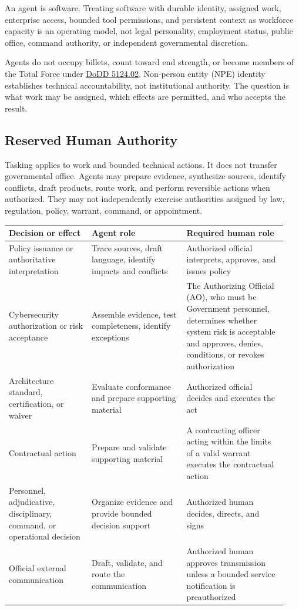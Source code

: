 \documentclass[11pt]{article}
\begin{document}
An agent is software. Treating software with durable identity, assigned
work, enterprise access, bounded tool permissions, and persistent
context as workforce capacity is an operating model, not legal
personality, employment status, public office, command authority, or
independent governmental discretion.

Agents do not occupy billets, count toward end strength, or become
members of the Total Force under
\href{https://www.esd.whs.mil/Portals/54/Documents/DD/issuances/dodd/512402p.PDF}{DoDD
5124.02}. Non-person entity (NPE) identity establishes technical
accountability, not institutional authority. The question is what work
may be assigned, which effects are permitted, and who accepts the
result.

\hypertarget{reserved-human-authority}{%
\subsection{Reserved Human Authority}\label{reserved-human-authority}}

Tasking applies to work and bounded technical actions. It does not
transfer governmental office. Agents may prepare evidence, synthesize
sources, identify conflicts, draft products, route work, and perform
reversible actions when authorized. They may not independently exercise
authorities assigned by law, regulation, policy, warrant, command, or
appointment.

\begingroup\footnotesize\setlength{\tabcolsep}{3pt}\begin{longtable}{p{0.28\linewidth}p{0.32\linewidth}p{0.34\linewidth}}
\toprule\noalign{}
Decision or effect & Agent role & Required human role \\
\midrule\noalign{}
\endhead
\bottomrule\noalign{}
\endlastfoot
Policy issuance or authoritative interpretation & Trace sources, draft
language, identify impacts and conflicts & Authorized official
interprets, approves, and issues policy \\
Cybersecurity authorization or risk acceptance & Assemble evidence, test
completeness, identify exceptions & The Authorizing Official (AO), who
must be Government personnel, determines whether system risk is
acceptable and approves, denies, conditions, or revokes authorization \\
Architecture standard, certification, or waiver & Evaluate conformance
and prepare supporting material & Authorized official decides and
executes the act \\
Contractual action & Prepare and validate supporting material & A
contracting officer acting within the limits of a valid warrant executes
the contractual action \\
Personnel, adjudicative, disciplinary, command, or operational decision
& Organize evidence and provide bounded decision support & Authorized
human decides, directs, and signs \\
Official external communication & Draft, validate, and route the
communication & Authorized human approves transmission unless a bounded
service notification is preauthorized \\
\end{longtable}\endgroup
\end{document}
